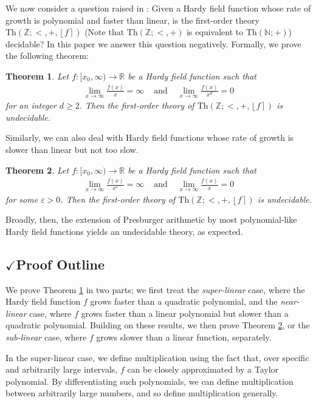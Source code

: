\documentclass{amsart}
\newtheorem{alphatheorem}{Theorem}
\theoremstyle{definition}
\newcommand{\nint}[1]{\left\lfloor #1 \right\rceil}
\newcommand{\e}{\varepsilon}
\newcommand{\NN}{\mathbb{N}}
\newcommand{\ZZ}{\mathbb{Z}}
\newcommand{\RR}{\mathbb{R}}
\newcommand{\theory}[1]{\mathrm{Th}(#1)}
\begin{document}
We now consider a question raised in \cite{Konieczny-2024}: Given a Hardy field function whose rate of growth is polynomial and faster than linear, is the first-order theory $\theory{\ZZ; <, +, \nint{f}}$ (Note that $\theory{\ZZ; <, +}$ is equivalent to $\theory{\NN; +}$) decidable? In this paper we answer this question negatively. Formally, we prove the following theorem:
\begin{alphatheorem}
\label{thm:main}
Let $f: [x_0,\infty) \to \RR$ be a Hardy field function such that
\begin{eqnarray}
\lim_{x \to \infty} \frac{f(x)}{x} = \infty &\text{ and } & \lim_{x \to \infty} \frac{f(x)}{x^{d}} = 0
\end{eqnarray}
for an integer $d \geq 2$. Then the first-order theory of $\theory{\ZZ; <, +, \nint{f}}$ is undecidable.
\end{alphatheorem}

Similarly, we can also deal with Hardy field functions whose rate of growth is slower than linear but not too slow.
\begin{alphatheorem}
\label{thm:other}
Let $f: [x_0,\infty) \to \RR$ be a Hardy field function such that
\begin{eqnarray}
\lim_{x \to \infty} \frac{f(x)}{x^{\e}} = \infty &\text{ and } & \lim_{x \to \infty} \frac{f(x)}{x} = 0
\end{eqnarray}
for some $\e > 0$. Then the first-order theory of $\theory{\ZZ; <, +, \nint{f}}$ is undecidable.
\end{alphatheorem}

Broadly, then, the extension of Presburger arithmetic by most polynomial-like Hardy field functions yields an undecidable theory, as expected.


\subsection{$\checkmark$Proof Outline}

We prove Theorem \ref{thm:main} in two parts; we first treat the \emph{super-linear} case, where the Hardy field function $f$ grows faster than a quadratic polynomial, and the \emph{near-linear} case, where $f$ grows faster than a linear polynomial but slower than a quadratic polynomial. Building on these results, we then prove Theorem \ref{thm:other}, or the \emph{sub-linear} case, where $f$ grows slower than a linear function, separately.

In the super-linear case, we define multiplication using the fact that, over specific and arbitrarily large intervals, $f$ can be closely approximated by a Taylor polynomial. By differentiating such polynomials, we can define multiplication between arbitrarily large numbers, and so define multiplication generally.
\end{document}

